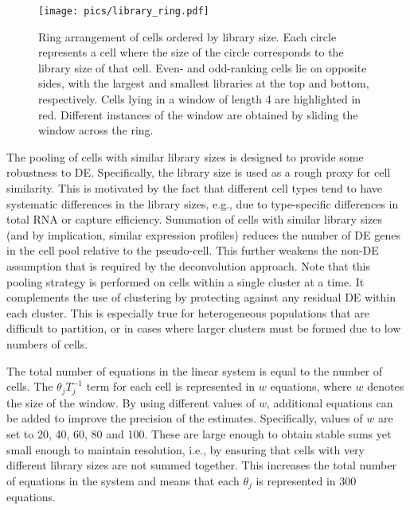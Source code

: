 \documentclass{article}
\begin{document}
\begin{figure}[bt]
    \begin{center}
        \texttt{[image: pics/library\_ring.pdf]}
    \end{center}
    \caption{
        Ring arrangement of cells ordered by library size.
        Each circle represents a cell where the size of the circle corresponds to the library size of that cell.
        Even- and odd-ranking cells lie on opposite sides, with the largest and smallest libraries at the top and bottom, respectively.
        Cells lying in a window of length 4 are highlighted in red.
        Different instances of the window are obtained by sliding the window across the ring.
    }
    \label{fig:library_ring}
\end{figure}

The pooling of cells with similar library sizes is designed to provide some robustness to DE.
Specifically, the library size is used as a rough proxy for cell similarity.
This is motivated by the fact that different cell types tend to have systematic differences in the library sizes, 
    e.g., due to type-specific differences in total RNA or capture efficiency.
Summation of cells with similar library sizes (and by implication, similar expression profiles) reduces the number of DE genes in the cell pool relative to the pseudo-cell.
This further weakens the non-DE assumption that is required by the deconvolution approach.
Note that this pooling strategy is performed on cells within a single cluster at a time.
It complements the use of clustering by protecting against any residual DE within each cluster.
This is especially true for heterogeneous populations that are difficult to partition, or in cases where larger clusters must be formed due to low numbers of cells.


The total number of equations in the linear system is equal to the number of cells.
The $\theta_jT_j^{-1}$ term for each cell is represented in $w$ equations, where $w$ denotes the size of the window.
By using different values of $w$, additional equations can be added to improve the precision of the estimates. 
Specifically, values of $w$ are set to 20, 40, 60, 80 and 100.
These are large enough to obtain stable sums yet small enough to maintain resolution, i.e., by ensuring that cells with very different library sizes are not summed together.
This increases the total number of equations in the system and means that each $\theta_j$ is represented in 300 equations. 
\end{document}
